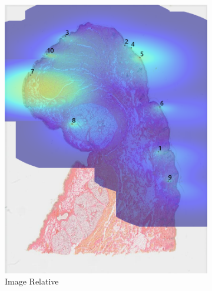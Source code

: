 \documentclass[a4paper,11pt]{report}
\numberwithin{figure}{chapter} %
\begin{document}
\begin{itemize}
\begin{figure}[H]
\begin{subfigure}[b]{0.19\textwidth}
            \includegraphics[width=\textwidth]{images/5501147_heatmap_image.png}
            \caption{Image Relative}
            \end{subfigure}
            \begin{subfigure}[b]{0.19\textwidth}

\end{subfigure}
\end{figure}
\end{itemize}
\end{document}
